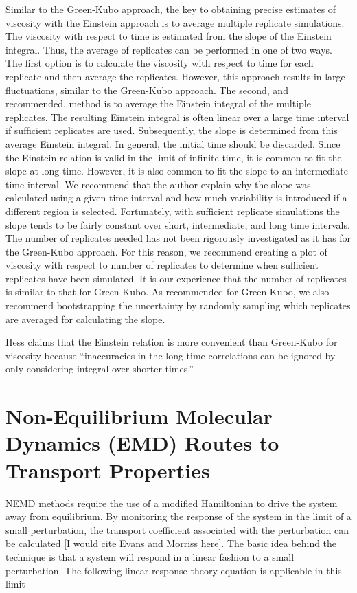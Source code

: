 \documentclass[9pt]{livecoms}
\begin{document}
Similar to the Green-Kubo approach, the key to obtaining precise estimates of viscosity with the Einstein approach is to average multiple replicate simulations. The viscosity with respect to time is estimated from the slope of the Einstein integral. Thus, the average of replicates can be performed in one of two ways. The first option is to calculate the viscosity with respect to time for each replicate and then average the replicates. However, this approach results in large fluctuations, similar to the Green-Kubo approach. The second, and recommended, method is to average the Einstein integral of the multiple replicates. The resulting Einstein integral is often linear over a large time interval if sufficient replicates are used. Subsequently, the slope is determined from this average Einstein integral. In general, the initial time should be discarded. Since the Einstein relation is valid in the limit of infinite time, it is common to fit the slope at long time. However, it is also common to fit the slope to an intermediate time interval. We recommend that the author explain why the slope was calculated using a given time interval and how much variability is introduced if a different region is selected. Fortunately, with sufficient replicate simulations the slope tends to be fairly constant over short, intermediate, and long time intervals. The number of replicates needed has not been rigorously investigated as it has for the Green-Kubo approach. For this reason, we recommend creating a plot of viscosity with respect to number of replicates to determine when sufficient replicates have been simulated. It is our experience that the number of replicates is similar to that for Green-Kubo. As recommended for Green-Kubo, we also recommend bootstrapping the uncertainty by randomly sampling which replicates are averaged for calculating the slope.

Hess claims that the Einstein relation is more convenient than Green-Kubo for viscosity because ``inaccuracies in the long time correlations can be ignored by only considering integral over shorter times.'' 

\section{Non-Equilibrium Molecular Dynamics (EMD) Routes to Transport Properties}

NEMD methods require the use of a modified Hamiltonian to drive the system away from equilibrium. By monitoring the response of the system in the limit of a small perturbation, the transport coefficient associated with the perturbation can be calculated [I would cite Evans and Morriss here]. The basic idea behind the technique is that a system will respond in a linear fashion to a small perturbation. The following linear response theory equation is applicable in this limit
\end{document}
